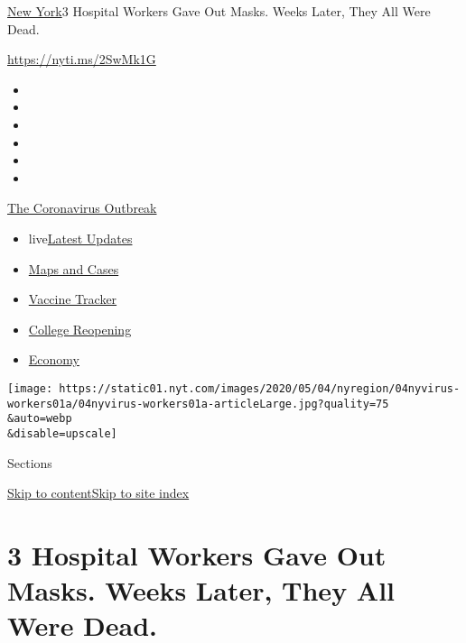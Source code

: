 \href{/section/nyregion}{New York}\textbar{}3 Hospital Workers Gave Out
Masks. Weeks Later, They All Were Dead.

\url{https://nyti.ms/2SwMk1G}

\begin{itemize}
\item
\item
\item
\item
\item
\item
\end{itemize}

\href{https://www.nytimes.com/news-event/coronavirus?action=click\&pgtype=Article\&state=default\&region=TOP_BANNER\&context=storylines_menu}{The
Coronavirus Outbreak}

\begin{itemize}
\tightlist
\item
  live\href{https://www.nytimes.com/2020/08/04/world/coronavirus-cases.html?action=click\&pgtype=Article\&state=default\&region=TOP_BANNER\&context=storylines_menu}{Latest
  Updates}
\item
  \href{https://www.nytimes.com/interactive/2020/us/coronavirus-us-cases.html?action=click\&pgtype=Article\&state=default\&region=TOP_BANNER\&context=storylines_menu}{Maps
  and Cases}
\item
  \href{https://www.nytimes.com/interactive/2020/science/coronavirus-vaccine-tracker.html?action=click\&pgtype=Article\&state=default\&region=TOP_BANNER\&context=storylines_menu}{Vaccine
  Tracker}
\item
  \href{https://www.nytimes.com/2020/08/02/us/covid-college-reopening.html?action=click\&pgtype=Article\&state=default\&region=TOP_BANNER\&context=storylines_menu}{College
  Reopening}
\item
  \href{https://www.nytimes.com/live/2020/08/04/business/stock-market-today-coronavirus?action=click\&pgtype=Article\&state=default\&region=TOP_BANNER\&context=storylines_menu}{Economy}
\end{itemize}

\texttt{[image: https://static01.nyt.com/images/2020/05/04/nyregion/04nyvirus-workers01a/04nyvirus-workers01a-articleLarge.jpg?quality=75\\\&auto=webp\\\&disable=upscale]}

Sections

\protect\hyperlink{site-content}{Skip to
content}\protect\hyperlink{site-index}{Skip to site index}

\hypertarget{3-hospital-workers-gave-out-masks-weeks-later-they-all-were-dead}{%
\section{3 Hospital Workers Gave Out Masks. Weeks Later, They All Were
Dead.}\label{3-hospital-workers-gave-out-masks-weeks-later-they-all-were-dead}}

